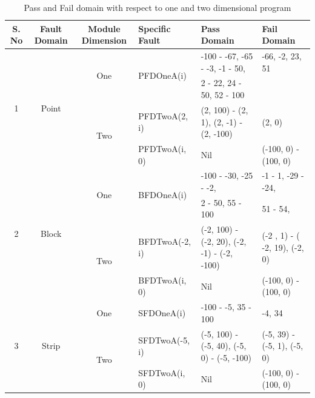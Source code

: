 \documentclass{acm_proc_article-sp}
\begin{document}
\onecolumn
\begin{table}[ht]
\centering
\tiny 

\begin{tabular}{|c|c|c|l|l|l|}

\hline 


S. No		& Fault Domain	 				& Module Dimension 		& Specific Fault	 		& Pass Domain 					& Fail Domain 			\\ \hline 

\multirow{4}{*}{1} 	&	\multirow{4}{*}{Point}		& 	\multirow{2}{*}{One}			&	\multirow{2}{*}{PFDOneA(i)}	&	-100 - -67, -65 - -3, -1 - 50,  			& -66, -2, 23, 51			 	\\  
				&									&							&							&	2 - 22, 24 - 50, 52 - 100				&							\\  \cline{3-6}
				&									&	\multirow{2}{*}{Two}			&	PFDTwoA(2, i)				&	(2, 100) - (2, 1),	 (2, -1) - (2, -100)		&  (2, 0)						\\  \cline{4-6}
				&									& 							&	PFDTwoA(i, 0)				&	Nil								& (-100, 0) - (100, 0)				\\  \hline



\multirow{4}{*}{2} 	&	\multirow{4}{*}{Block}		& 	\multirow{2}{*}{One}			&	\multirow{2}{*}{BFDOneA(i)}	&	-100 - -30, -25 - -2, 					& 	-1 - 1, -29 - -24,		 	\\ 
				&									&							&							&	2 - 50, 55 - 100						&	51 - 54,				\\  \cline{3-6}
				&									&	\multirow{2}{*}{Two}			&	BFDTwoA(-2, i)				&	(-2, 100) - (-2, 20), (-2, -1) - (-2, -100)	& 	(-2 , 1) - ( -2, 19), (-2, 0)		\\  \cline{4-6}
				&									& 							&	BFDTwoA(i, 0)				&	Nil								& 	(-100, 0) - (100, 0)		\\  \hline
				
				



\multirow{4}{*}{3} 	&	\multirow{4}{*}{Strip}		& 	\multirow{2}{*}{One}			&	\multirow{2}{*}{SFDOneA(i)}	&	\multirow{2}{*}{-100 - -5, 35 - 100}		& 	\multirow{2}{*}{-4, 34	}\\ 
				&									&							&							&									&				\\  \cline{3-6}
				&									&	\multirow{2}{*}{Two}			&	SFDTwoA(-5, i)				&	(-5, 100) - (-5, 40), (-5, 0) - (-5, -100)		&  (-5, 39) - (-5, 1), (-5, 0)			\\  \cline{4-6}
				&									& 							&	SFDTwoA(i, 0)				&	Nil								&  (-100, 0) - (100, 0)			\\  \hline
				
				
\end{tabular}
\bigskip
\caption{Pass and Fail domain with respect to one and two dimensional program}
\label{tab:failtable}
\end{table}
\end{document}
